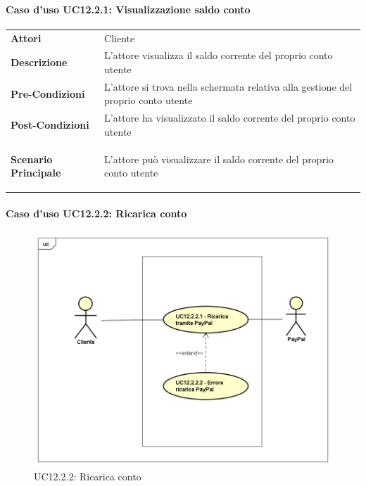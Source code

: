 \paragraph{Caso d'uso UC12.2.1: Visualizzazione saldo conto}
\label{UC12_2_1}

\begin{minipage}{\linewidth}
	\begin{tabular}{ l | p{11cm}}
		\hline
		\rowcolor{Gray}
		\multicolumn{2}{c}{UC12.2.1 - Visualizzazione saldo conto} \\
		\hline
		\textbf{Attori} & Cliente \\
		\textbf{Descrizione} & L'attore visualizza il saldo corrente del proprio conto utente \\
		\textbf{Pre-Condizioni} & L'attore si trova nella schermata relativa alla gestione del proprio conto utente \\
		\textbf{Post-Condizioni} & L'attore ha visualizzato il saldo corrente del proprio conto utente \\
		\textbf{Scenario Principale} & 
		\begin{enumerate*}[label=(\arabic*.),itemjoin={\newline}]
			\item L'attore può visualizzare il saldo corrente del proprio conto utente
		\end{enumerate*}\\
	\end{tabular}
\end{minipage}

\paragraph{Caso d'uso UC12.2.2: Ricarica conto}
\label{UC12_2_2}
\begin{figure}[ht]
	\centering
	\includegraphics[scale=0.45]{UML/UC12_2_2.png}
	\caption{UC12.2.2: Ricarica conto}
\end{figure}

